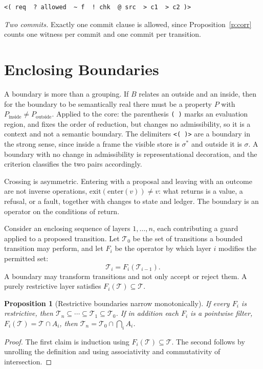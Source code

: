 \documentclass[11pt]{article}
\newtheorem{proposition}{Proposition}
\newcommand{\code}[1]{\texttt{#1}}
\begin{document}
\begin{Verbatim}
<( req  ? allowed  ~ f  ! chk  @ src  > c1  > c2 )>
\end{Verbatim}
\emph{Two commits.} Exactly one commit clause is allowed, since Proposition~\ref{p:corr} counts one witness per commit and one commit per transition.

\section{Enclosing Boundaries}\label{s:bound}

A boundary is more than a grouping. If $B$ relates an outside and an inside, then for the boundary to be semantically real there must be a property $P$ with $P_{\mathrm{inside}}\neq P_{\mathrm{outside}}$. Applied to the core: the parenthesis \code{( )} marks an evaluation region, and fixes the order of reduction, but changes no admissibility, so it is a context and not a semantic boundary. The delimiters \code{<( )>} are a boundary in the strong sense, since inside a frame the visible store is $\sigma^{\ast}$ and outside it is $\sigma$. A boundary with no change in admissibility is representational decoration, and the criterion classifies the two pairs accordingly.

Crossing is asymmetric. Entering with a proposal and leaving with an outcome are not inverse operations, $\mathrm{exit}(\mathrm{enter}(v))\neq v$: what returns is a value, a refusal, or a fault, together with changes to state and ledger. The boundary is an operator on the conditions of return.

Consider an enclosing sequence of layers $1,\dots,n$, each contributing a guard applied to a proposed transition. Let $\mathcal T_0$ be the set of transitions a bounded transition may perform, and let $F_i$ be the operator by which layer $i$ modifies the permitted set:
\[
\mathcal T_{i}=F_i(\mathcal T_{i-1}).
\]
A boundary may transform transitions and not only accept or reject them. A purely restrictive layer satisfies $F_i(\mathcal T)\subseteq\mathcal T$.

\begin{proposition}[Restrictive boundaries narrow monotonically]\label{p:bound}
If every $F_i$ is restrictive, then $\mathcal T_n\subseteq\cdots\subseteq\mathcal T_1\subseteq\mathcal T_0$. If in addition each $F_i$ is a pointwise filter, $F_i(\mathcal T)=\mathcal T\cap A_i$, then $\mathcal T_n=\mathcal T_0\cap\bigcap_iA_i$.
\end{proposition}
\begin{proof}
The first claim is induction using $F_i(\mathcal T)\subseteq\mathcal T$. The second follows by unrolling the definition and using associativity and commutativity of intersection.
\end{proof}
\end{document}

